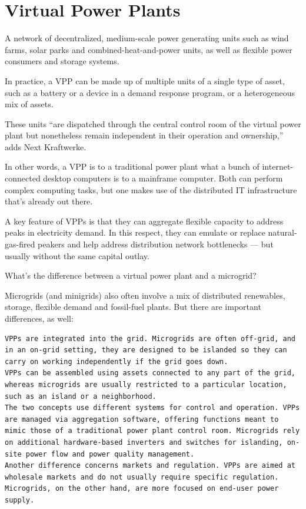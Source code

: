 \documentclass[
]{book}
\begin{document}
\hypertarget{virtual-power-plants}{%
\chapter{Virtual Power Plants}\label{virtual-power-plants}}

A network of decentralized, medium-scale power generating units such as wind farms, solar parks and combined-heat-and-power units, as well as flexible power consumers and storage systems.

In practice, a VPP can be made up of multiple units of a single type of asset, such as a battery or a device in a demand response program, or a heterogeneous mix of assets.

These units ``are dispatched through the central control room of the virtual power plant but nonetheless remain independent in their operation and ownership,'' adds Next Kraftwerke.

In other words, a VPP is to a traditional power plant what a bunch of internet-connected desktop computers is to a mainframe computer. Both can perform complex computing tasks, but one makes use of the distributed IT infrastructure that's already out there.

A key feature of VPPs is that they can aggregate flexible capacity to address peaks in electricity demand. In this respect, they can emulate or replace natural-gas-fired peakers and help address distribution network bottlenecks --- but usually without the same capital outlay.

What's the difference between a virtual power plant and a microgrid?

Microgrids (and minigrids) also often involve a mix of distributed renewables, storage, flexible demand and fossil-fuel plants. But there are important differences, as well:

\begin{verbatim}
VPPs are integrated into the grid. Microgrids are often off-grid, and in an on-grid setting, they are designed to be islanded so they can carry on working independently if the grid goes down. 
VPPs can be assembled using assets connected to any part of the grid, whereas microgrids are usually restricted to a particular location, such as an island or a neighborhood. 
The two concepts use different systems for control and operation. VPPs are managed via aggregation software, offering functions meant to mimic those of a traditional power plant control room. Microgrids rely on additional hardware-based inverters and switches for islanding, on-site power flow and power quality management. 
Another difference concerns markets and regulation. VPPs are aimed at wholesale markets and do not usually require specific regulation. Microgrids, on the other hand, are more focused on end-user power supply. 
\end{verbatim}
\end{document}
